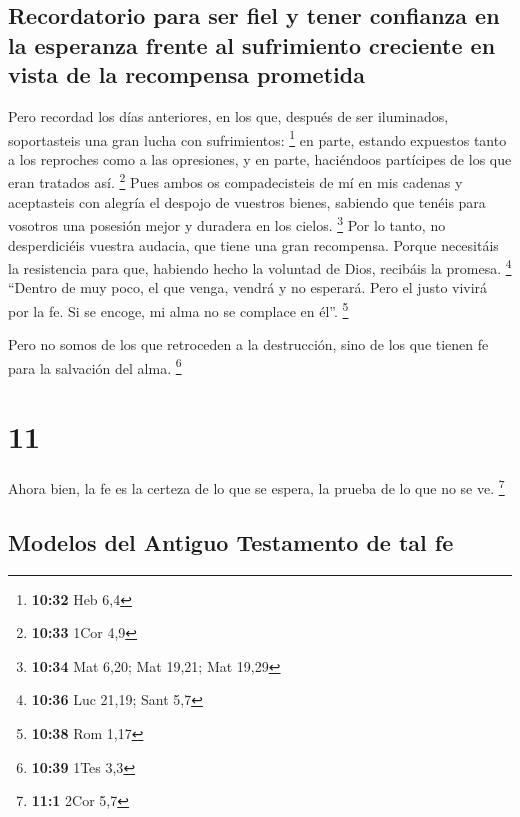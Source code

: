 \hypertarget{recordatorio-para-ser-fiel-y-tener-confianza-en-la-esperanza-frente-al-sufrimiento-creciente-en-vista-de-la-recompensa-prometida}{%
\subsection{Recordatorio para ser fiel y tener confianza en la esperanza
frente al sufrimiento creciente en vista de la recompensa
prometida}\label{recordatorio-para-ser-fiel-y-tener-confianza-en-la-esperanza-frente-al-sufrimiento-creciente-en-vista-de-la-recompensa-prometida}}

 Pero recordad los días anteriores, en los que, después
de ser iluminados, soportasteis una gran lucha con sufrimientos:
\footnote{\textbf{10:32} Heb 6,4}  en parte, estando
expuestos tanto a los reproches como a las opresiones, y en parte,
haciéndoos partícipes de los que eran tratados así. \footnote{\textbf{10:33}
  1Cor 4,9}  Pues ambos os compadecisteis de mí en mis
cadenas y aceptasteis con alegría el despojo de vuestros bienes,
sabiendo que tenéis para vosotros una posesión mejor y duradera en los
cielos. \footnote{\textbf{10:34} Mat 6,20; Mat 19,21; Mat 19,29}
 Por lo tanto, no desperdiciéis vuestra audacia, que
tiene una gran recompensa.  Porque necesitáis la
resistencia para que, habiendo hecho la voluntad de Dios, recibáis la
promesa. \footnote{\textbf{10:36} Luc 21,19; Sant 5,7} 
``Dentro de muy poco, el que venga, vendrá y no esperará.
 Pero el justo vivirá por la fe. Si se encoge, mi alma no
se complace en él''. \footnote{\textbf{10:38} Rom 1,17}

 Pero no somos de los que retroceden a la destrucción,
sino de los que tienen fe para la salvación del alma. \footnote{\textbf{10:39}
  1Tes 3,3}

\hypertarget{section-10}{%
\section{11}\label{section-10}}

 Ahora bien, la fe es la certeza de lo que se espera, la
prueba de lo que no se ve. \footnote{\textbf{11:1} 2Cor 5,7}

\hypertarget{modelos-del-antiguo-testamento-de-tal-fe}{%
\subsection{Modelos del Antiguo Testamento de tal
fe}\label{modelos-del-antiguo-testamento-de-tal-fe}}

